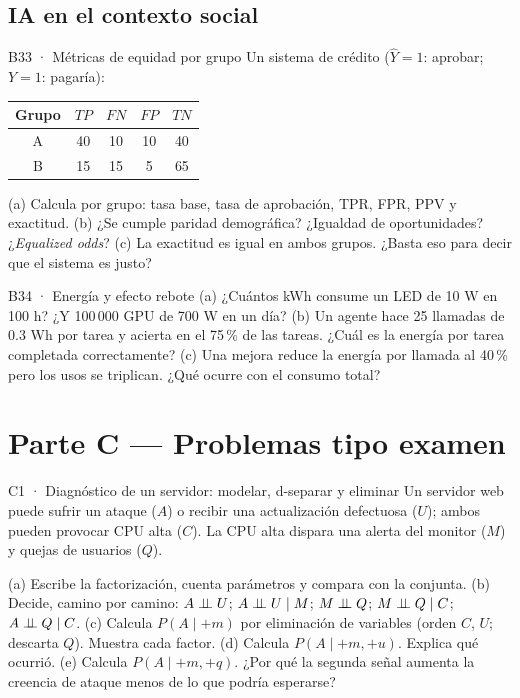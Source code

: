 \subsection{IA en el contexto social}

\begin{ejercicio}{B33 · Métricas de equidad por grupo }
Un sistema de crédito ($\hat Y=1$: aprobar; $Y=1$: pagaría):
\begin{center}\small
\begin{tabular}{c|cccc}
Grupo & $TP$ & $FN$ & $FP$ & $TN$\\\hline
A & 40 & 10 & 10 & 40\\
B & 15 & 15 & 5 & 65
\end{tabular}
\end{center}
(a) Calcula por grupo: tasa base, tasa de aprobación, TPR, FPR, PPV y exactitud.
(b) ¿Se cumple paridad demográfica? ¿Igualdad de oportunidades? ¿\emph{Equalized odds}?
(c) La exactitud es igual en ambos grupos. ¿Basta eso para decir que el sistema es justo?
\end{ejercicio}

\begin{ejercicio}{B34 · Energía y efecto rebote }
(a) ¿Cuántos kWh consume un LED de 10 W en 100 h? ¿Y 100\,000 GPU de 700 W en un día?
(b) Un agente hace 25 llamadas de 0.3 Wh por tarea y acierta en el 75\,\% de las tareas. ¿Cuál es la energía por tarea
completada correctamente? (c) Una mejora reduce la energía por llamada al 40\,\% pero los usos se triplican.
¿Qué ocurre con el consumo total?
\end{ejercicio}

\newpage
\section{Parte C — Problemas tipo examen }

\begin{ejercicio}{C1 · Diagnóstico de un servidor: modelar, d-separar y eliminar }
Un servidor web puede sufrir un ataque ($A$) o recibir una actualización defectuosa ($U$); ambos pueden provocar CPU alta ($C$).
La CPU alta dispara una alerta del monitor ($M$) y quejas de usuarios ($Q$).
\begin{center}\figSrv\qquad\tabSrv\end{center}
(a)  Escribe la factorización, cuenta parámetros y compara con la conjunta.
(b)  Decide, camino por camino: $A\perp\!\!\!\perp U$; $A\perp\!\!\!\perp U\mid M$; $M\perp\!\!\!\perp Q$; $M\perp\!\!\!\perp Q\mid C$; $A\perp\!\!\!\perp Q\mid C$.
(c)  Calcula $P(A\mid+m)$ por eliminación de variables (orden $C$, $U$; descarta $Q$). Muestra cada factor.
(d)  Calcula $P(A\mid+m,+u)$. Explica qué ocurrió.
(e)  Calcula $P(A\mid+m,+q)$. ¿Por qué la segunda señal aumenta la creencia de ataque menos de lo que podría esperarse?
\end{ejercicio}

